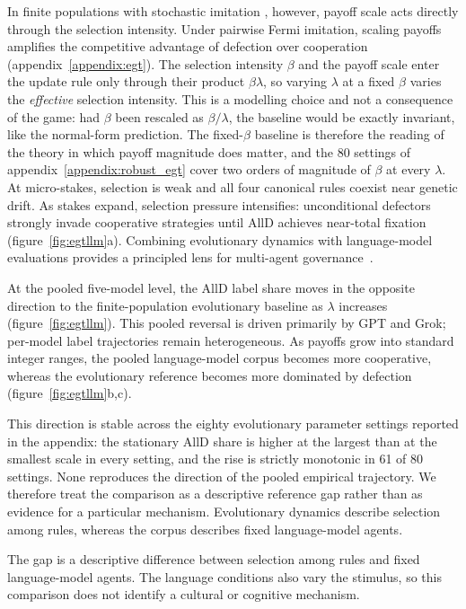 \documentclass[11pt,a4paper]{article}
\newcommand{\lam}{\lambda}
\newcommand{\rev}[1]{{\color{red}#1}}
\newcommand{\rev}[1]{#1}
\begin{document}
In finite populations with stochastic imitation \citep{nowak2004emergence}, however, payoff scale acts
directly through the selection intensity. Under pairwise Fermi imitation, scaling payoffs
amplifies the competitive advantage of defection over cooperation
(appendix~\ref{appendix:egt}). \rev{The selection intensity $\beta$ and the
payoff scale enter the update rule only through their product $\beta\lam$, so
varying $\lam$ at a fixed $\beta$ varies the \emph{effective} selection
intensity. This is a modelling choice and not a consequence of the game: had
$\beta$ been rescaled as $\beta/\lam$, the baseline would be exactly invariant,
like the normal-form prediction. The fixed-$\beta$ baseline is therefore the
reading of the theory in which payoff magnitude does matter, and the 80
settings of appendix~\ref{appendix:robust_egt} cover two orders of magnitude of
$\beta$ at every $\lam$.} At micro-stakes, selection is weak and all four
canonical rules coexist near genetic drift. As stakes expand, selection pressure
intensifies: unconditional defectors strongly invade cooperative strategies until
AllD achieves near-total fixation (figure~\ref{fig:egtllm}a). Combining
evolutionary dynamics with language-model evaluations provides a principled
lens for multi-agent governance~\cite{balabanova2025media,buscemi2025llms,xie2026evolutionary,han2026social}.

At the pooled five-model level, the AllD label share moves in the opposite
direction to the finite-population evolutionary baseline as $\lam$ increases
(figure~\ref{fig:egtllm}). This pooled reversal is driven primarily by GPT and
Grok; per-model label trajectories remain heterogeneous. As payoffs grow into
standard integer ranges, the pooled language-model corpus becomes more
cooperative, whereas the evolutionary reference becomes more dominated by
defection (figure~\ref{fig:egtllm}b,c).

This direction is stable across the eighty evolutionary parameter settings
reported in the appendix: the stationary AllD share is higher at the largest
than at the smallest scale in every setting, and the rise is strictly monotonic
in 61 of 80 settings. None reproduces the direction of the pooled empirical
trajectory.
We therefore treat the comparison as a descriptive reference gap rather than as
evidence for a particular mechanism. Evolutionary dynamics describe selection
among rules, whereas the corpus describes fixed language-model agents.

The gap is a descriptive difference between selection among rules and fixed
language-model agents. The language conditions also vary the stimulus, so this
comparison does not identify a cultural or cognitive mechanism.
\end{document}
